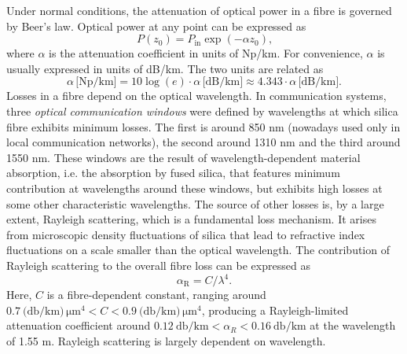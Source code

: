 \documentclass{standalone}
\begin{document}
Under normal conditions, the attenuation of optical power in a fibre is governed by Beer's law. Optical power at any point can be expressed as
\begin{equation}
P(z_0) = P_\textrm{in} \exp\left(-\alpha z_0\right) \textrm{,}
\end{equation}
where $\alpha$ is the attenuation coefficient in units of Np/km. For convenience, $\alpha$ is usually expressed in units of dB/km. The two units are related as
\begin{equation}
\alpha \,\textrm{[Np/km]} = 10\log(e) \cdot \alpha \,\textrm{[dB/km]} \approx 4.343 \cdot \alpha \,\textrm{[dB/km]} \textrm{.}
\end{equation}
Losses in a fibre depend on the optical wavelength. In communication systems, three \emph{optical communication windows} were defined by wavelengths at which silica fibre exhibits minimum losses. The first is around 850 nm (nowadays used only in local communication networks), the second around 1310 nm and the third around 1550 nm. These windows are the result of wavelength-dependent material absorption, i.e. the absorption by fused silica, that features minimum contribution at wavelengths around these windows, but exhibits high losses at some other characteristic wavelengths. The source of other losses is, by a large extent, Rayleigh scattering, which is a fundamental loss mechanism. It arises from microscopic density fluctuations of silica that lead to refractive index fluctuations on a scale smaller than the optical wavelength. The contribution of Rayleigh scattering to the overall fibre loss can be expressed as
\begin{equation} \label{eq:rayleigh_loss}
\alpha_\textrm{R} = C / \lambda^4 \textrm{.}
\end{equation}
Here, $C$ is a fibre-dependent constant, ranging around $\SI{0.7}{(\decibel / \kilo \meter) \, \micro \meter ^4} < C < \SI{0.9}{(\decibel / \kilo \meter) \, \micro \meter ^4}$, producing a Rayleigh-limited attenuation coefficient around $\SI{0.12}{\decibel / \kilo \meter} < \alpha_R < \SI{0.16}{\decibel / \kilo \meter}$ at the wavelength of 1.55 \textmu m. Rayleigh scattering is largely dependent on wavelength. \\
\end{document}
